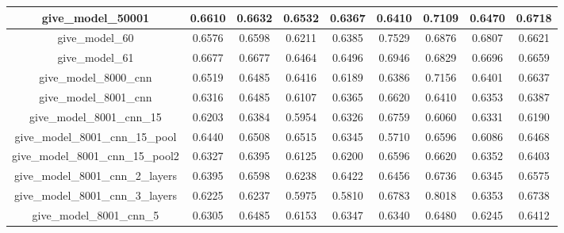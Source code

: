\begin{table}[!h]
\begin{tabular} {|c|c|c|c|c|c|c|c|c| }
        give\_model\_50001                & 0.6610                        & 0.6632                         & 0.6532                      & 0.6367                  & 0.6410 & 0.7109 & 0.6470 & 0.6718 \\ \hline
        give\_model\_60                   & 0.6576                        & 0.6598                         & 0.6211                      & 0.6385                  & 0.7529 & 0.6876 & 0.6807 & 0.6621 \\ \hline
        give\_model\_61                   & 0.6677                        & 0.6677                         & 0.6464                      & 0.6496                  & 0.6946 & 0.6829 & 0.6696 & 0.6659 \\ \hline
        give\_model\_8000\_cnn            & 0.6519                        & 0.6485                         & 0.6416                      & 0.6189                  & 0.6386 & 0.7156 & 0.6401 & 0.6637 \\ \hline
        give\_model\_8001\_cnn            & 0.6316                        & 0.6485                         & 0.6107                      & 0.6365                  & 0.6620 & 0.6410 & 0.6353 & 0.6387 \\ \hline
        give\_model\_8001\_cnn\_15        & 0.6203                        & 0.6384                         & 0.5954                      & 0.6326                  & 0.6759 & 0.6060 & 0.6331 & 0.6190 \\ \hline
        give\_model\_8001\_cnn\_15\_pool  & 0.6440                        & 0.6508                         & 0.6515                      & 0.6345                  & 0.5710 & 0.6596 & 0.6086 & 0.6468 \\ \hline
        give\_model\_8001\_cnn\_15\_pool2 & 0.6327                        & 0.6395                         & 0.6125                      & 0.6200                  & 0.6596 & 0.6620 & 0.6352 & 0.6403 \\ \hline
        give\_model\_8001\_cnn\_2\_layers & 0.6395                        & 0.6598                         & 0.6238                      & 0.6422                  & 0.6456 & 0.6736 & 0.6345 & 0.6575 \\ \hline
        give\_model\_8001\_cnn\_3\_layers & 0.6225                        & 0.6237                         & 0.5975                      & 0.5810                  & 0.6783 & 0.8018 & 0.6353 & 0.6738 \\ \hline
        give\_model\_8001\_cnn\_5         & 0.6305                        & 0.6485                         & 0.6153                      & 0.6347                  & 0.6340 & 0.6480 & 0.6245 & 0.6412 \\ \hline

\end{tabular}
\end{table}
